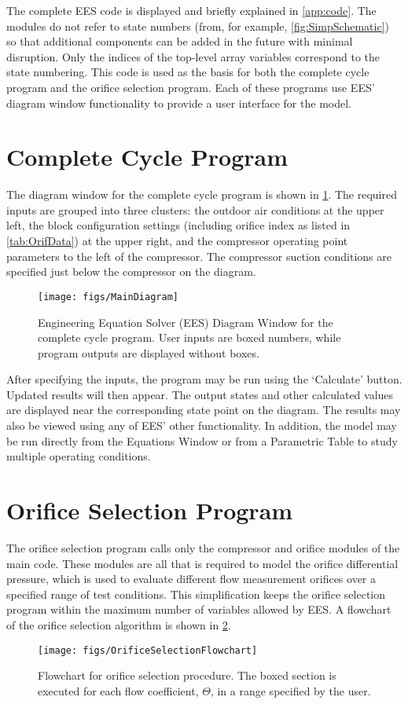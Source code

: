 The complete EES code is displayed and briefly explained in \cref{app:code}.
The modules do not refer to state numbers (from, for example, \cref{fig:SimpSchematic})
so that additional components can be added in the future with minimal disruption.
Only the indices of the top-level array variables correspond to the state numbering.
This code is used as the basis for both the complete cycle program and the 
orifice selection program. 
Each of these programs use EES' diagram window functionality
to provide a user interface for the model.

\section{Complete Cycle Program} \label{sec:MainModel}
The diagram window for the complete cycle program is shown in \cref{fig:MainDiag}.
The required inputs are grouped into three clusters: the outdoor air conditions
at the upper left, the block configuration settings (including orifice index
as listed in \cref{tab:OrifData}) at the upper right, and
the compressor operating point parameters to the left of the compressor.
The compressor suction conditions are specified just below the compressor
on the diagram.
\begin{figure}[htbp]
  \centering
  \texttt{[image: figs/MainDiagram]}
  \caption{Engineering Equation Solver (EES) Diagram Window for the complete
    cycle program. User inputs are boxed numbers, while program outputs are displayed without boxes.}
  \label{fig:MainDiag}
\end{figure}

After specifying the inputs, the program may be run using the `Calculate' button. 
Updated results will then appear.
The output states and other calculated values are displayed near the corresponding
state point on the diagram. 
The results may also be viewed using any of EES' other functionality.
In addition, the model may be run directly from the Equations Window or
from a Parametric Table to study multiple operating conditions.

\section{Orifice Selection Program} \label{sec:OrifSelect}
The orifice selection program calls only the 
compressor and orifice modules of the main code.
These modules are all that is required to model the orifice differential pressure,
which is used to evaluate different flow measurement orifices over a specified
range of test conditions.
This simplification keeps the orifice selection program within the maximum
number of variables allowed by EES.
A flowchart of the orifice selection algorithm is shown in \cref{fig:FlowOrifSelect}.
\begin{figure}[htbp]
  \centering
  \texttt{[image: figs/OrificeSelectionFlowchart]}
  \caption{Flowchart for orifice selection procedure. 
    The boxed section is executed for each flow coefficient, $\Theta$,
    in a range specified by the user.}
  \label{fig:FlowOrifSelect}
\end{figure}

